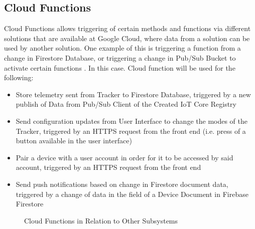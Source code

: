 \documentclass[conference]{IEEEtran}
\begin{document}
\subsection{Cloud Functions}
Cloud Functions allows triggering of certain methods and functions via different solutions that are available at Google Cloud, where data from a solution can be used by another solution. One example of this is triggering a function from a change in Firestore 
Database, or triggering a change in Pub/Sub Bucket to activate certain functions \cite{cloudfunctionwebsite}. In this case. Cloud function will be used for the following:
\begin{itemize}
\item Store telemetry sent from Tracker to Firestore Database, triggered by a new publish of Data from Pub/Sub Client of the Created IoT Core Registry
\item Send configuration updates from User Interface to change the modes of the Tracker, triggered by an HTTPS request from the front end (i.e. press of a button available in the user interface)
\item Pair a device with a user account in order for it to be accessed by said account, triggered by an HTTPS request from the front end
\item Send push notifications based on change in Firestore document data, triggered by a change of data in the field of a Device Document in Firebase Firestore
\end{itemize}

\begin{figure}[ht!]
    \centering
    \def\svgwidth{\columnwidth}
    \scalebox{1.8}{}
    \caption{Cloud Functions in Relation to Other Subsystems}
    \label{fig5}
\end{figure}
\end{document}

